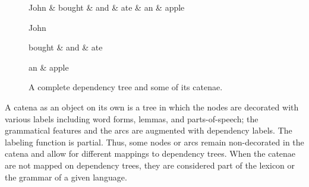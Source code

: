 \documentclass[output=paper]{langsci/langscibook}
\begin{document}
\begin{figure}[h]
  \centering
\begin{dependency}[theme = simple]
   \begin{deptext}[column sep=1em]
    John \& bought \& and \& ate \& an \& apple \\
   \end{deptext}
   \end{dependency}

\begin{dependency}[theme = simple]
   \begin{deptext}[column sep=0.5em]
         John \\
   \end{deptext}
   \end{dependency}
\quad%
\begin{dependency}[theme = simple]
   \begin{deptext}[column sep=0.5em]
         bought \& and \& ate \\
   \end{deptext}
   \end{dependency}
\quad%
\begin{dependency}[theme = simple]
   \begin{deptext}[column sep=0.5em]
         an \& apple\\
   \end{deptext}
   \end{dependency}


  \caption{A complete dependency tree and some of its catenae.}
  \label{fig:CatenaExamples}
\end{figure}


A catena as an object on its own is a tree in which the nodes are decorated
with various labels including word forms, lemmas, and parts-of-speech; the
grammatical features and the arcs are augmented with dependency labels. The
labeling function is partial. Thus, some nodes or arcs remain
non-decorated in the catena and allow for different mappings to dependency
trees. When the catenae are not mapped on dependency trees, they are considered part of
the lexicon or the grammar of a given language.
\end{document}
